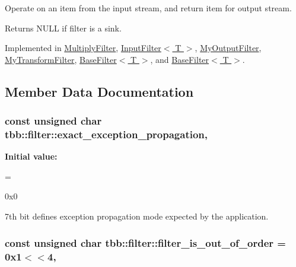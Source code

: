 Operate on an item from the input stream, and return item for output stream. 

Returns N\+U\+L\+L if filter is a sink. 

Implemented in \hyperlink{classMultiplyFilter_a04297d3dfd7e83c01cc0279a684b952a}{Multiply\+Filter}, \hyperlink{classInputFilter_a8b26e42b9414aabad06853540772f771}{Input\+Filter$<$ T $>$}, \hyperlink{classMyOutputFilter_a6102b27306e4bd5e55264b9c1fdee497}{My\+Output\+Filter}, \hyperlink{classMyTransformFilter_ae34e365ac37e83f71607e75c46a847de}{My\+Transform\+Filter}, \hyperlink{classBaseFilter_a603a4b099a76e84d427fcf89e4cf91a0}{Base\+Filter$<$ T $>$}, and \hyperlink{classBaseFilter_a603a4b099a76e84d427fcf89e4cf91a0}{Base\+Filter$<$ T $>$}.



\subsection{Member Data Documentation}
\hypertarget{classtbb_1_1filter_aab9689e23a96c6c9bf1c8caae74d92ee}{}
\subsubsection[{exact\+\_\+exception\+\_\+propagation}]{\setlength{\rightskip}{0pt plus 5cm}const unsigned char tbb\+::filter\+::exact\+\_\+exception\+\_\+propagation\hspace{0.3cm}{\ttfamily [static]}, {\ttfamily [protected]}}\label{classtbb_1_1filter_aab9689e23a96c6c9bf1c8caae74d92ee}
{\bfseries Initial value\+:}
\begin{DoxyCode}
=

            0x0
\end{DoxyCode}


7th bit defines exception propagation mode expected by the application. 

\hypertarget{classtbb_1_1filter_a091fcf6abc79edfa5c8bf01f742e2392}{}
\subsubsection[{filter\+\_\+is\+\_\+out\+\_\+of\+\_\+order}]{\setlength{\rightskip}{0pt plus 5cm}const unsigned char tbb\+::filter\+::filter\+\_\+is\+\_\+out\+\_\+of\+\_\+order = 0x1$<$$<$4\hspace{0.3cm}{\ttfamily [static]}, {\ttfamily [protected]}}\label{classtbb_1_1filter_a091fcf6abc79edfa5c8bf01f742e2392}


